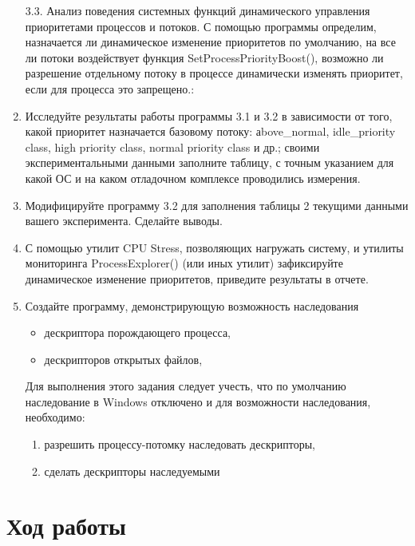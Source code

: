 \documentclass[a4paper]{article}
\begin{document}
\begin{enumerate}
3.3. Анализ поведения системных функций динамического управления приоритетами процессов и потоков. С помощью программы определим, назначается ли динамическое изменение приоритетов по умолчанию, на все ли потоки воздействует функция SetProcessPriorityBoost(), возможно ли разрешение отдельному потоку в процессе динамически изменять приоритет, если для процесса это запрещено.:
\item  Исследуйте результаты работы программы 3.1 и 3.2 в зависимости от того, какой приоритет назначается базовому потоку: аbove\_normal, idle\_priority class, high priority class, normal priority class и др.; своими экспериментальными данными заполните таблицу, с точным указанием для какой ОС и на каком отладочном комплексе проводились измерения.
\item  Модифицируйте программу 3.2 для заполнения таблицы 2 текущими данными вашего эксперимента. Сделайте выводы.
\item  С помощью утилит CPU Stress, позволяющих нагружать систему, и утилиты мониторинга ProcessExplorer() (или иных утилит) зафиксируйте динамическое изменение приоритетов, приведите результаты в отчете.
\item  Создайте программу, демонстрирующую возможность наследования
	 \begin{itemize}
		\item дескриптора порождающего процесса,
		\item дескрипторов открытых файлов,
	 \end{itemize}
Для выполнения этого задания следует учесть, что по умолчанию наследование в Windows отключено и для возможности наследования, необходимо:
	 \begin{enumerate}
		\item  разрешить процессу-потомку наследовать дескрипторы,
		\item  сделать дескрипторы наследуемыми
	\end{enumerate}
\end{enumerate}


\section{Ход работы}
\end{document}
